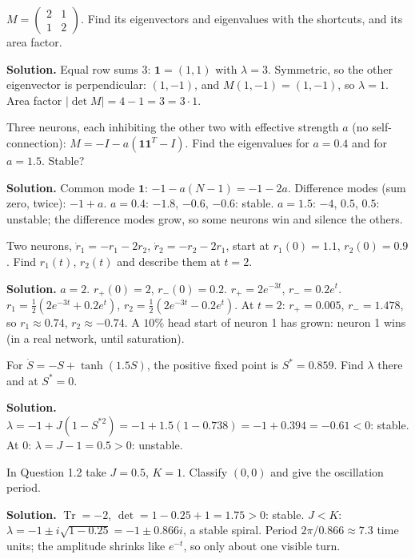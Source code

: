 \begin{example}
$M=\begin{pmatrix}2&1\\1&2\end{pmatrix}$. Find its eigenvectors and eigenvalues with the shortcuts, and its area factor.

\textbf{Solution.} Equal row sums $3$: $\mathbf1=(1,1)$ with $\lambda=3$. Symmetric, so the other eigenvector is perpendicular: $(1,-1)$, and $M(1,-1)=(1,-1)$, so $\lambda=1$.
Area factor $|\det M|=4-1=3=3\cdot1$. \checkmark
\end{example}

\begin{example}
Three neurons, each inhibiting the other two with effective strength $a$ (no self-connection): $M=-I-a(\mathbf1\mathbf1^T-I)$. Find the eigenvalues for $a=0.4$ and for $a=1.5$. Stable?

\textbf{Solution.} Common mode $\mathbf1$: $-1-a(N-1)=-1-2a$. Difference modes (sum zero, twice): $-1+a$.
$a=0.4$: $-1.8$, $-0.6$, $-0.6$: stable. $a=1.5$: $-4$, $0.5$, $0.5$: unstable; the difference modes grow, so some neurons win and silence the others.
\end{example}

\begin{example}
Two neurons, $\dot r_1=-r_1-2r_2$, $\dot r_2=-r_2-2r_1$, start at $r_1(0)=1.1$, $r_2(0)=0.9$. Find $r_1(t)$, $r_2(t)$ and describe them at $t=2$.

\textbf{Solution.} $a=2$. $r_+(0)=2$, $r_-(0)=0.2$. $r_+=2e^{-3t}$, $r_-=0.2e^{t}$.
$r_1=\tfrac12(2e^{-3t}+0.2e^{t})$, $r_2=\tfrac12(2e^{-3t}-0.2e^{t})$. At $t=2$: $r_+=0.005$, $r_-=1.478$, so $r_1\approx0.74$, $r_2\approx-0.74$.
A $10\%$ head start of neuron 1 has grown: neuron 1 wins (in a real network, until saturation).
\end{example}

\begin{example}
For $\dot S=-S+\tanh(1.5S)$, the positive fixed point is $S^*=0.859$. Find $\lambda$ there and at $S^*=0$.

\textbf{Solution.} $\lambda=-1+J(1-S^{*2})=-1+1.5(1-0.738)=-1+0.394=-0.61<0$: stable. At $0$: $\lambda=J-1=0.5>0$: unstable.
\end{example}

\begin{example}
In Question 1.2 take $J=0.5$, $K=1$. Classify $(0,0)$ and give the oscillation period.

\textbf{Solution.} $\operatorname{Tr}=-2$, $\det=1-0.25+1=1.75>0$: stable. $J<K$: $\lambda=-1\pm i\sqrt{1-0.25}=-1\pm0.866i$, a stable spiral.
Period $2\pi/0.866\approx7.3$ time units; the amplitude shrinks like $e^{-t}$, so only about one visible turn.
\end{example}

